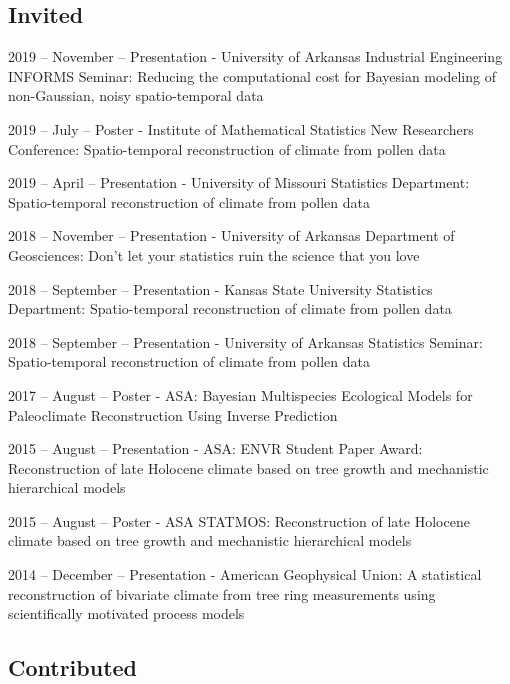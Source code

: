\documentclass[11pt,]{article}
\renewenvironment{itemize}{
  \begin{list}{}{
    \setlength{\leftmargin}{1.5em}
  }
}{
  \end{list}
}
\begin{document}
\hypertarget{invited}{%
\subsection{Invited}\label{invited}}

\begin{itemize}
\item
  2019 -- November -- Presentation - University of Arkansas Industrial
  Engineering INFORMS Seminar: Reducing the computational cost for
  Bayesian modeling of non-Gaussian, noisy spatio-temporal data
\item
  2019 -- July -- Poster - Institute of Mathematical Statistics New
  Researchers Conference: Spatio-temporal reconstruction of climate from
  pollen data
\item
  2019 -- April -- Presentation - University of Missouri Statistics
  Department: Spatio-temporal reconstruction of climate from pollen data
\item
  2018 -- November -- Presentation - University of Arkansas Department
  of Geosciences: Don't let your statistics ruin the science that you
  love
\item
  2018 -- September -- Presentation - Kansas State University Statistics
  Department: Spatio-temporal reconstruction of climate from pollen data
\item
  2018 -- September -- Presentation - University of Arkansas Statistics
  Seminar: Spatio-temporal reconstruction of climate from pollen data
\item
  2017 -- August -- Poster - ASA: Bayesian Multispecies Ecological
  Models for Paleoclimate Reconstruction Using Inverse Prediction
\item
  2015 -- August -- Presentation - ASA: ENVR Student Paper Award:
  Reconstruction of late Holocene climate based on tree growth and
  mechanistic hierarchical models
\item
  2015 -- August -- Poster - ASA STATMOS: Reconstruction of late
  Holocene climate based on tree growth and mechanistic hierarchical
  models
\item
  2014 -- December -- Presentation - American Geophysical Union: A
  statistical reconstruction of bivariate climate from tree ring
  measurements using scientifically motivated process models
\end{itemize}

\hypertarget{contributed}{%
\subsection{Contributed}\label{contributed}}
\end{document}
